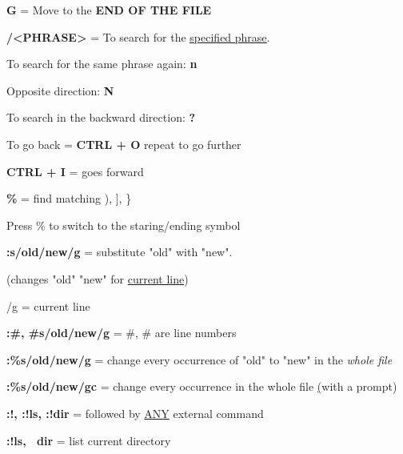 \documentclass[12pt, letterpaper]{article}
\begin{document}
\begin{flushleft}
\textbf{G} = Move to the \textbf{END OF THE FILE} \\
\par

\textbf{/<PHRASE>} = To search for the \underline{\underline{specified phrase}}. 
\par
To search for the same phrase again: \textbf{n} 
\par
Opposite direction: \textbf{N} \\
\par

To search in the backward direction: \textbf{?} 
\par
To go back = \textbf{CTRL + O} \Leftarrow repeat \hspace{1ex} to \hspace{1ex} go \hspace{1ex} further 
\par
\textbf{CTRL + I} = goes forward \\
\par

\textbf{\%} = find matching ), ], \} \par
Press \% to switch to the staring/ending symbol \\
\par

\textbf{:s/old/new/g} = substitute "old" with "new". \par
(changes "old" \rightarrow "new" for \underline{current line}) \par
/g = current line \\
\par

\textbf{:#, #s/old/new/g} = #, # are line numbers \\
\par

\textbf{:\%s/old/new/g} = change every occurrence of "old" to "new" in the \textit{whole file} \\
\par

\textbf{:\%s/old/new/gc} = change every occurrence in the whole file \underline(with a prompt) \\
\par

\textbf{:!, :!ls, :!dir} = followed by \underline{ANY} external command \\
\par
\textbf{:!ls, ~dir} = list current directory \\
\par


\end{flushleft}
\end{document}
